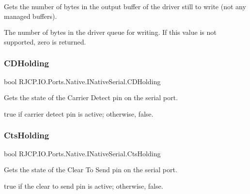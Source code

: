 Gets the number of bytes in the output buffer of the driver still to write (not any managed buffers). 

The number of bytes in the driver queue for writing. If this value is not supported, zero is returned. \mbox{\label{interface_r_j_c_p_1_1_i_o_1_1_ports_1_1_native_1_1_i_native_serial_a4f7b0b93b5e18cb79eaf1965fceff422}} 
\subsubsection{\texorpdfstring{CDHolding}{CDHolding}}
{\footnotesize\ttfamily bool R\+J\+C\+P.\+I\+O.\+Ports.\+Native.\+I\+Native\+Serial.\+C\+D\+Holding\hspace{0.3cm}{\ttfamily [get]}}



Gets the state of the Carrier Detect pin on the serial port. 

{\ttfamily true} if carrier detect pin is active; otherwise, {\ttfamily false}. \mbox{\label{interface_r_j_c_p_1_1_i_o_1_1_ports_1_1_native_1_1_i_native_serial_ab2bb261a340690035fd01c2aec04f9e9}} 
\subsubsection{\texorpdfstring{CtsHolding}{CtsHolding}}
{\footnotesize\ttfamily bool R\+J\+C\+P.\+I\+O.\+Ports.\+Native.\+I\+Native\+Serial.\+Cts\+Holding\hspace{0.3cm}{\ttfamily [get]}}



Gets the state of the Clear To Send pin on the serial port. 

{\ttfamily true} if the clear to send pin is active; otherwise, {\ttfamily false}. \mbox{\label{interface_r_j_c_p_1_1_i_o_1_1_ports_1_1_native_1_1_i_native_serial_a43c1deb102eb429932846496a01723cd}} 
